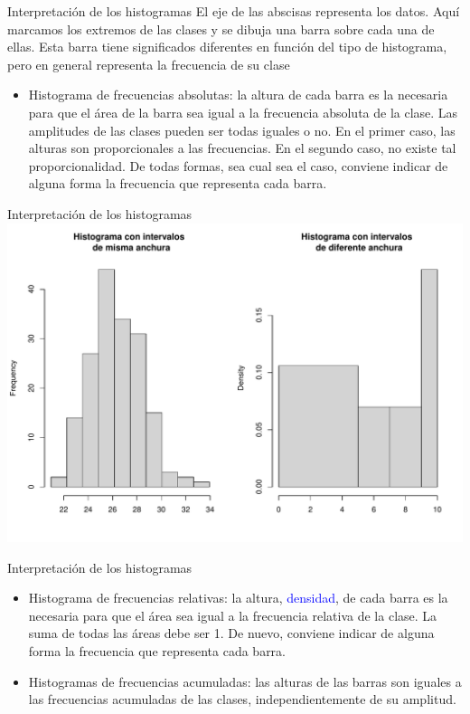 \documentclass[
  ignorenonframetext,
  aspectratio=169]{beamer}
\providecommand{\tightlist}{%
  \setlength{\itemsep}{0pt}\setlength{\parskip}{0pt}}
\newcommand\blue[1]{\textcolor{blue}{#1}}
\begin{document}
\begin{frame}{Interpretación de los histogramas}
\protect\hypertarget{interpretaciuxf3n-de-los-histogramas}{}
El eje de las abscisas representa los datos. Aquí marcamos los extremos
de las clases y se dibuja una barra sobre cada una de ellas. Esta barra
tiene significados diferentes en función del tipo de histograma, pero en
general representa la frecuencia de su clase

\begin{itemize}
\tightlist
\item
  Histograma de frecuencias absolutas: la altura de cada barra es la
  necesaria para que el área de la barra sea igual a la frecuencia
  absoluta de la clase. Las amplitudes de las clases pueden ser todas
  iguales o no. En el primer caso, las alturas son proporcionales a las
  frecuencias. En el segundo caso, no existe tal proporcionalidad. De
  todas formas, sea cual sea el caso, conviene indicar de alguna forma
  la frecuencia que representa cada barra.
\end{itemize}
\end{frame}

\begin{frame}{Interpretación de los histogramas}
\protect\hypertarget{interpretaciuxf3n-de-los-histogramas-1}{}
\includegraphics{Hora6_files/figure-beamer/unnamed-chunk-45-1.pdf}
\end{frame}

\begin{frame}{Interpretación de los histogramas}
\protect\hypertarget{interpretaciuxf3n-de-los-histogramas-2}{}
\begin{itemize}
\tightlist
\item
  Histograma de frecuencias relativas: la altura, \blue{densidad}, de
  cada barra es la necesaria para que el área sea igual a la frecuencia
  relativa de la clase. La suma de todas las áreas debe ser 1. De nuevo,
  conviene indicar de alguna forma la frecuencia que representa cada
  barra.
\item
  Histogramas de frecuencias acumuladas: las alturas de las barras son
  iguales a las frecuencias acumuladas de las clases, independientemente
  de su amplitud.
\end{itemize}
\end{frame}
\end{document}
